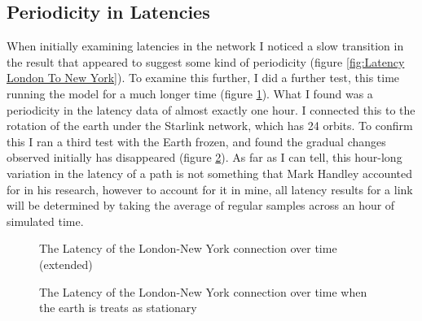 \documentclass[12pt]{report}
\begin{document}
\subsection{Periodicity in Latencies}

When initially examining latencies in the network I noticed a slow transition in the result that appeared to suggest some kind of periodicity (figure \ref{fig:Latency London To New York}). To examine this further, I did a further test, this time running the model for a much longer time (figure \ref{fig:Latency London To New York Extended}). What I found was a periodicity in the latency data of almost exactly one hour. I connected this to the rotation of the earth under the Starlink network, which has 24 orbits. To confirm this I ran a third test with the Earth frozen, and found the gradual changes observed initially has disappeared (figure \ref{fig:Latency London To New York (Not Accounting for Rotation of Earth)}). As far as I can tell, this hour-long variation in the latency of a path is not something that Mark Handley accounted for in his research, however to account for it in mine, all latency results for a link will be determined by taking the average of regular samples across an hour of simulated time.

\begin{figure}
\caption{The Latency of the London-New York connection over time (extended)}
\label{fig:Latency London To New York Extended}
\end{figure}

\begin{figure}
\caption{The Latency of the London-New York connection over time when the earth is treats as stationary}
\label{fig:Latency London To New York (Not Accounting for Rotation of Earth)}
\end{figure}
\end{document}

